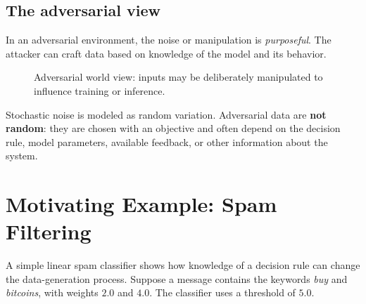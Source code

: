 \documentclass[11pt,a4paper]{report}
\begin{document}
\subsection{The adversarial view}

In an adversarial environment, the noise or manipulation is \emph{purposeful}. The attacker can craft data based on knowledge of the model and its behavior.

\begin{figure}[H]
\centering
{}
\caption{Adversarial world view: inputs may be deliberately manipulated to influence training or inference.}
\label{fig:adversarial-world}
\end{figure}

\begin{warningbox}[title={Stochastic noise vs. adversarial data}]
Stochastic noise is modeled as random variation. Adversarial data are \textbf{not random}: they are chosen with an objective and often depend on the decision rule, model parameters, available feedback, or other information about the system.
\end{warningbox}

\section{Motivating Example: Spam Filtering}

A simple linear spam classifier shows how knowledge of a decision rule can change the data-generation process. Suppose a message contains the keywords \emph{buy} and \emph{bitcoins}, with weights $2.0$ and $4.0$. The classifier uses a threshold of $5.0$.
\end{document}
